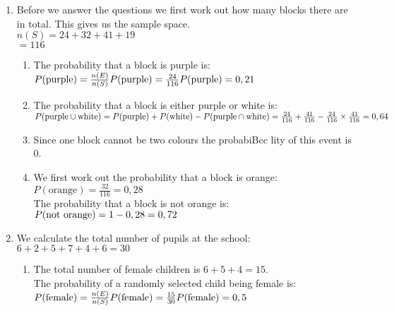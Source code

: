 \begin{solutions}{}{
\begin{enumerate}[itemsep=5pt, label=\textbf{\arabic*}. ] 

\item %
    Before we answer the questions we first work out how many blocks there are in total. This gives us the sample space.\\
    $n(S) = 24 + 32 + 41 + 19$\\
	 $= 116$
    \begin{enumerate}[noitemsep, label=\textbf{(\alph*)} ]

    \item The probability that a block is purple is:\\
    $P(\mbox{purple}) = \frac{n(E)}{n(S)}\\
     P(\mbox{purple}) = \frac{24}{116}\\
     P(\mbox{purple}) = 0,21$

    \item The probability that a block is either purple or white is:\\
    $P(\mbox{purple} \cup \mbox{white}) = P(\mbox{purple}) + P(\mbox{white}) - P(\mbox{purple} \cap \mbox{white})\\
    = \frac{24}{116} + \frac{41}{116} - \frac{24}{116} \times \frac{41}{116}\\
    = 0,64$

    \item Since one block cannot be two colours the probabiBcc   lity of this event is $0$.

    \item We first work out the probability that a block is orange:\\
    $P(\mbox{orange}) = \frac{32}{116}
	       = 0,28$\\
    The probability that a block is not orange is:\\
    $P(\mbox{not orange}) = 1 - 0,28\\
		   = 0,72$
    \end{enumerate}
    
\item %
We calculate the total number of pupils at the school:\\
$6 + 2 + 5 + 7 + 4 + 6 = 30$
    \begin{enumerate}[noitemsep, label=\textbf{(\alph*)} ]
    \item The total number of female children is $6 + 5 + 4 = 15$.\\
    The probability of a randomly selected child being female is:\\
    $P(\mbox{female}) = \frac{n(E)}{n(S)}\\
     P(\mbox{female}) = \frac{15}{30}\\
     P(\mbox{female}) = 0,5$


\end{enumerate}
\end{enumerate}}
\end{solutions}
